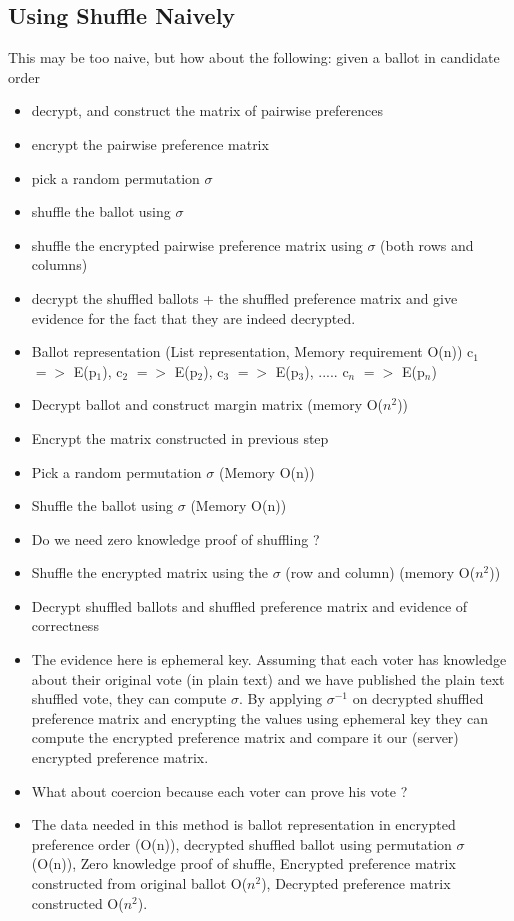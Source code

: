\documentclass{llncs}
\begin{document}
\subsection{Using Shuffle Naively}

This may be too naive, but how about the following: given a ballot
in candidate order
\begin{itemize}
\item decrypt, and construct the matrix of pairwise preferences
\item encrypt the pairwise preference matrix
\item pick a random permutation $\sigma$ 
\item shuffle the ballot using $\sigma$
\item shuffle the encrypted pairwise preference matrix using
$\sigma$ (both rows and columns)
\item decrypt the shuffled ballots + the shuffled preference matrix
and give evidence for the fact that they are indeed decrypted.
\end{itemize}

\begin{itemize}
\item Ballot representation (List representation, Memory requirement O(n))
c$_{1}$ $=>$ E(p$_{1}$),  c$_{2}$ $=>$ E(p$_{2}$), c$_{3}$ $=>$ E(p$_{3}$), ..... c$_{n}$ $=>$ E(p$_{n}$)
\item Decrypt ballot and construct margin matrix (memory O($n^2$))
\item Encrypt the matrix constructed in previous step 
\item Pick a random permutation  $\sigma$  (Memory O(n))
\item Shuffle the ballot using $\sigma$ (Memory O(n))
\item Do we need zero knowledge proof of shuffling ?
\item Shuffle the encrypted matrix using the $\sigma$ (row and column) (memory O($n^2$))
\item Decrypt shuffled ballots and shuffled preference matrix and evidence of 
correctness
\item The evidence here is ephemeral key. Assuming that each voter has
knowledge about their original vote (in plain text) and we have published the 
plain text shuffled vote, they can compute $\sigma$. By applying $\sigma^{-1}$ on 
decrypted shuffled preference matrix and encrypting the values using ephemeral key
they can compute the encrypted preference matrix and compare it our (server) 
encrypted preference matrix. 
\item What about coercion because each voter can prove his vote ?  
\item The data needed in this method is ballot representation in encrypted preference order (O(n)), decrypted shuffled ballot 
using permutation $\sigma$ (O(n)), Zero knowledge proof of shuffle, Encrypted preference matrix constructed from original ballot O($n^2$), Decrypted preference matrix constructed O($n^2$). 

	 


\end{itemize}
\end{document}

